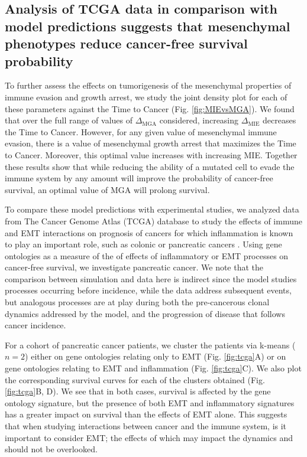 \documentclass[11pt]{article}
\begin{document}
\subsection{Analysis of TCGA data in comparison with model predictions suggests that mesenchymal phenotypes reduce cancer-free survival probability}\label{tcga}

To further assess the effects on tumorigenesis of the mesenchymal properties of immune evasion and growth arrest, we study the joint density plot for each of these parameters against the Time to Cancer (Fig. \ref{fig:MIEvsMGA}). We found that over the full range of values of $\Delta_\text{MGA}$ considered, increasing $\Delta_\text{MIE}$ decreases the Time to Cancer. However, for any given value of mesenchymal immune evasion, there is a value of mesenchymal growth arrest that maximizes the Time to Cancer. Moreover, this optimal value increases with increasing MIE. Together these results show that while reducing the ability of a mutated cell to evade the immune system by any amount will improve the probability of cancer-free survival, an optimal value of MGA will prolong survival. 
\par 
To compare these model predictions with experimental studies, we analyzed data from The Cancer Genome Atlas (TCGA) database to study the effects of immune and EMT interactions on prognosis of cancers for which inflammation is known to play an important role, such as colonic or pancreatic cancers \cite{hu10_inflammationinduced, balkwill01_inflammation}. Using gene ontologies as a measure of the of effects of inflammatory or EMT processes on cancer-free survival, we investigate pancreatic cancer. We note that the comparison between simulation and data here is indirect since the model studies processes occurring before incidence, while the data address subsequent events, but analogous processes are at play during both the pre-cancerous clonal dynamics addressed by the model, and the progression of disease that follows cancer incidence. 
\par
For a cohort of pancreatic cancer patients, we cluster the patients via k-means ($n=2$) either on gene ontologies relating only to EMT (Fig. \ref{fig:tcga}A) or on gene ontologies relating to EMT and inflammation (Fig. \ref{fig:tcga}C). We also plot the corresponding survival curves for each of the clusters obtained (Fig. \ref{fig:tcga}B, D). We see that in both cases, survival is affected by the gene ontology signature, but the presence of both EMT and inflammatory signatures has a greater impact on survival than the effects of EMT alone. This suggests that when studying interactions between cancer and the immune system, is it important to consider EMT; the effects of which may impact the dynamics and should not be overlooked. 
\end{document}
